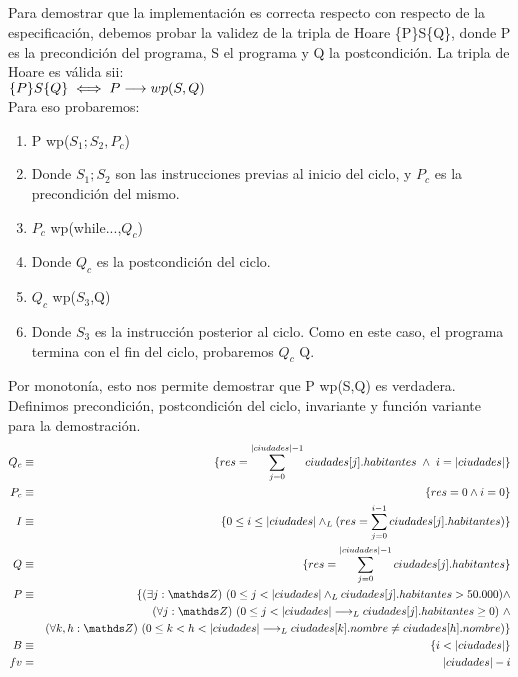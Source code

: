 \documentclass[10pt,a4paper,fleqn]{article}
\begin{document}
\subsection{}
Para demostrar que la implementación es correcta respecto con respecto de la especificación, debemos probar la validez de la tripla de Hoare  \{P\}S\{Q\}, donde P es la precondición del programa, S el programa y Q la postcondición. La tripla de Hoare es válida sii:\\
$\{P\}S\{Q\} \iff P \longrightarrow wp(S,Q)$\\
Para eso probaremos:
\begin{enumerate}
    \item P \implica wp($S_1;S_2, P_c$)
    \item[] Donde $S_1;S_2$ son las instrucciones previas al inicio del ciclo, y $P_c$ es la precondición del mismo.
    \item $P_c$ \implica wp(while...,$Q_c$)
    \item[] Donde $Q_c$ es la postcondición del ciclo.
    \item $Q_c$ \implica wp($S_3$,Q)
    \item[] Donde $S_3$ es la instrucción posterior al ciclo. Como en este caso, el programa termina con el fin del ciclo, probaremos $Q_c$ \implica Q.
\end{enumerate}
Por monotonía, esto nos permite demostrar que P \implica wp(S,Q) es verdadera. Definimos precondición, postcondición del ciclo, invariante y función variante para la demostración.\\
\begin{eqnarray}
    Q_c &\equiv& \{res = \small \displaystyle \sum_{j=0}^{|ciudades|-1} ciudades[j].habitantes \ \land \ i = |ciudades|\} \notag \\
    P_c &\equiv& \{res=0 \land i=0 \} \notag \\
    I &\equiv& \{ 0 \leq i \leq |ciudades| \yLuego (res = \small \displaystyle \sum_{j=0}^{i-1} ciudades[j].habitantes)\} \notag \\
    Q &\equiv& \{res = \sum\limits_{j=0}^{|ciudades| - 1} ciudades[j].habitantes\} \notag \\
    P &\equiv& \{ \existe[unalinea]{j}{\ent}{0 \leq j < |ciudades| \yLuego ciudades[j].habitantes > 50.000} \land \notag \\
    & & \paraTodo[unalinea]{j}{\ent}{0 \leq j < |ciudades| \implicaLuego ciudades[j].habitantes \geq 0}
    \ \land \notag \\ & & \paraTodo[unalinea]{k, h}{\ent}{0 \leq k < h < |ciudades| \implicaLuego ciudades[k].nombre \neq ciudades[h].nombre} \} \notag \\
    B &\equiv& \{ i < |ciudades| \} \notag \\
    fv &=& |ciudades| - i \notag
\end{eqnarray}
\end{document}
